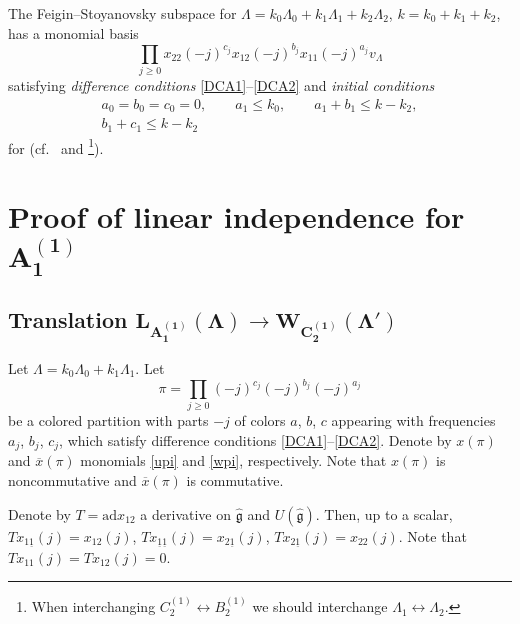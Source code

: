 \documentclass[10pt,a4paper]{amsart}
\newcommand{\gk}
{\hat{{\mathfrak g}}}
\newcommand{\ox}
{{\overline{x}}}
\numberwithin{equation}{section}
\begin{document}
The Feigin--Stoyanovsky subspace  for $ \Lambda=k_0\Lambda_0+k_1\Lambda_1+k_2\Lambda_2$, $k=k_0+k_1+k_2$, has a monomial basis
\begin{equation} \label{wpi}
\prod_{j\geq 0} x_{2 2}(-j)^{c_j} x_{1 2}(-j)^{b_j} x_{1 1}(-j)^{a_j} v_\Lambda
\end{equation}
satisfying
{\em difference conditions} \eqref{DCA1}--\eqref{DCA2}
and {\em initial conditions}
\begin{gather}
	\label{ICC1} a_0=b_0 =c_0  = 0,\qquad
	a_1 \leq k_0,\qquad
	a_1+b_1\leq k-k_2, \\
	\label{ICC2} b_1+c_1\leq k-k_2
\end{gather}
for  (cf.\ \cite{BPT} and \cite{P}\footnote{When interchanging $C_2^{(1)}\leftrightarrow B_2^{(1)}$ we should interchange $\Lambda_1 \leftrightarrow \Lambda_2$.}).





\section[Proof of linear independence for A\_1\^(1)]{Proof of linear independence for $\boldsymbol{ A_1^{(1)}}$}



\subsection[Translation L\_A\_1\^(1)(Lambda)to W\_C\_2\^(1)(Lambda')]{Translation $\boldsymbol{ L_{A_1^{(1)}}(\Lambda)\to W_{C_2^{(1)}}(\Lambda')}$}

Let $\Lambda = k_0 \Lambda_0 + k_1 \Lambda_1$. Let
\[\pi=\prod_{j\geq 0}(-j)^{c_j}(-j)^{b_j}(-j)^{a_j}\]
be a colored partition with parts $-j$ of colors $a$, $b$, $c$ appearing with frequencies $a_j$, $b_j$, $c_j$, which satisfy difference conditions \eqref{DCA1}--\eqref{DCA2}.
Denote by $x(\pi)$ and $\ox(\pi)$ monomials \eqref{upi} and \eqref{wpi}, respectively. Note that $x(\pi)$ is noncommutative and $\ox(\pi)$ is commutative.


Denote by $T=\textrm{ad}  x_{12}$ a derivative on $\gk$ and $U(\gk)$. Then, up to a scalar,
$ T x_{1 \underline{1}}(j)  = x_{1 2}(j)$,
 $T x_{\underline{1} \underline{1}}(j)  = x_{2\underline{1}}(j)$, $
 T x_{2\underline{1}}(j)  = x_{22}(j)$.
Note that
$T x_{1 1}(j) = T x_{1 2}(j)=0$.
\end{document}
